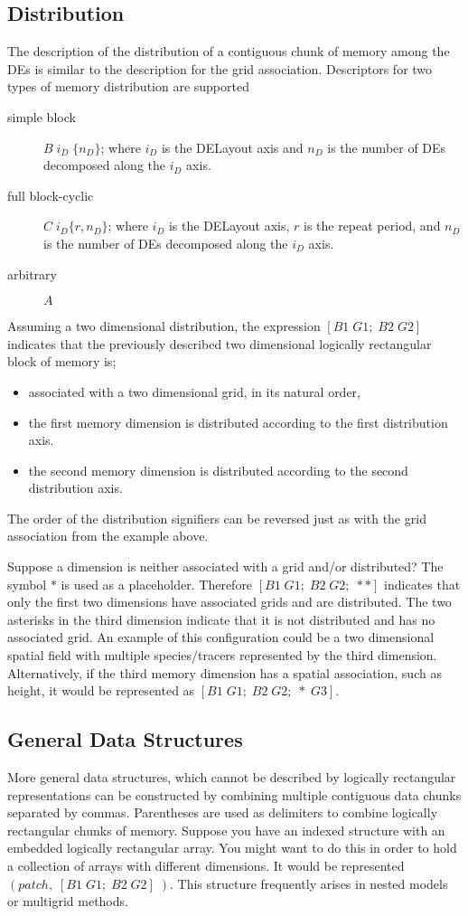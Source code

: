 \documentclass{article}
\begin{document}
\subsection{Distribution}
The description of the distribution of a contiguous chunk of memory among the DEs is similar to the description for the grid association. Descriptors for two types of memory distribution are supported
\begin{description}
	\item[simple block] $B \; i_D \; \{ n_D \} $; where $i_D$ is the DELayout axis and $n_D$ is the number of DEs decomposed along the $i_D$ axis.
	\item[full block-cyclic] $C \; i_D \{ r,n_D \} $; where $i_D$ is the DELayout axis, $r$ is the repeat period, and $n_D$ is the number of DEs decomposed along the $i_D$ axis.
	\item[arbitrary] $A$ 
\end{description}
Assuming a two dimensional distribution, the expression $[ B1 \; G1; \; B2 \; G2 ]$ indicates that the previously described two dimensional logically rectangular block of memory is;
\begin{itemize}
	\item associated with a two dimensional grid, in its natural order,
	\item the first memory dimension is distributed according to the first distribution axis.
	\item the second memory dimension is distributed according to the second distribution axis.

\end{itemize}
The order of the distribution signifiers can be reversed just as with the grid association from the example above. 

Suppose a dimension is neither associated with a grid and/or distributed? The symbol $\ast$ is used as a placeholder. Therefore $[ B1 \; G1; \; B2 \; G2; \; \ast \ast ]$ indicates that only the first two dimensions have associated grids and are distributed. The two asterisks in the third dimension indicate that it is not distributed and has no associated grid. An example of this configuration could be a two dimensional spatial field with multiple species/tracers represented by the third dimension. Alternatively, if the third memory dimension has a spatial association, such as height, it would be represented as $[ B1 \; G1; \; B2 \; G2; \; \ast \; G3 ]$.

\subsection{General Data Structures}
More general data structures, which cannot be described by logically rectangular representations can be constructed by combining multiple contiguous data chunks separated by commas. Parentheses are used as delimiters to combine logically rectangular chunks of memory. Suppose you have an indexed structure with an embedded logically rectangular array. You might want to do this in order to hold a collection of arrays with different dimensions.  It would be represented $( patch , \; [ B1 \; G1; \; B2 \; G2 ] \; )$. This structure frequently arises in nested models or multigrid methods.
\end{document}
